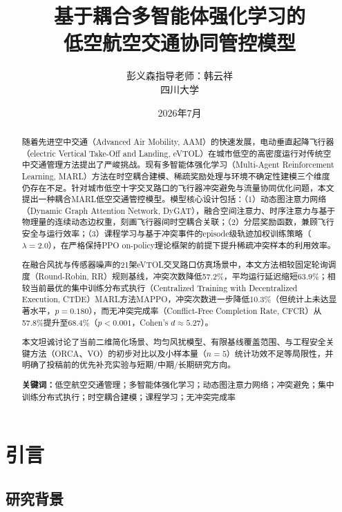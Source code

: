 \documentclass[12pt,a4paper,UTF8]{ctexart}
\title{\textbf{基于耦合多智能体强化学习的\\低空航空交通协同管控模型}}
\author{彭义森\quad 指导老师：韩云祥\\[4pt]
\small 四川大学}
\date{2026年7月}
\begin{document}
\maketitle

\begin{abstract}
随着先进空中交通（Advanced Air Mobility, AAM）的快速发展，电动垂直起降飞行器（electric Vertical Take-Off and Landing, eVTOL）在城市低空的高密度运行对传统空中交通管理方法提出了严峻挑战。现有多智能体强化学习（Multi-Agent Reinforcement Learning, MARL）方法在时空耦合建模、稀疏奖励处理与环境不确定性建模三个维度仍存在不足。针对城市低空十字交叉路口的飞行器冲突避免与流量协同优化问题，本文提出一种耦合MARL低空交通管控模型。模型核心设计包括：（1）动态图注意力网络（Dynamic Graph Attention Network, DyGAT），融合空间注意力、时序注意力与基于物理量的连续动态边权重，刻画飞行器间时空耦合关联；（2）分层奖励函数，兼顾飞行安全与运行效率；（3）课程学习与基于冲突事件的episode级轨迹加权训练策略（$\lambda=2.0$），在严格保持PPO on-policy理论框架的前提下提升稀疏冲突样本的利用效率。

在融合风扰与传感器噪声的21架eVTOL交叉路口仿真场景中，本文方法相较固定轮询调度（Round-Robin, RR）规则基线，冲突次数降低57.2\%，平均运行延迟缩短63.9\%；相较当前最优的集中训练分布式执行（Centralized Training with Decentralized Execution, CTDE）MARL方法MAPPO，冲突次数进一步降低10.3\%（但统计上未达显著水平，$p=0.180$），而无冲突完成率（Conflict-Free Completion Rate, CFCR）从57.8\%提升至68.4\%（$p<0.001$，Cohen's $d \approx 5.27$）。

本文坦诚讨论了当前二维简化场景、均匀风扰模型、有限基线覆盖范围、与工程安全关键方法（ORCA、VO）的初步对比以及小样本量（$n=5$）统计功效不足等局限性，并明确了投稿前的优先补充实验与短期/中期/长期研究方向。

\noindent\textbf{关键词：}低空航空交通管理；多智能体强化学习；动态图注意力网络；冲突避免；集中训练分布式执行；时空耦合建模；课程学习；无冲突完成率
\end{abstract}

\section{引言}

\subsection{研究背景}
\end{document}
